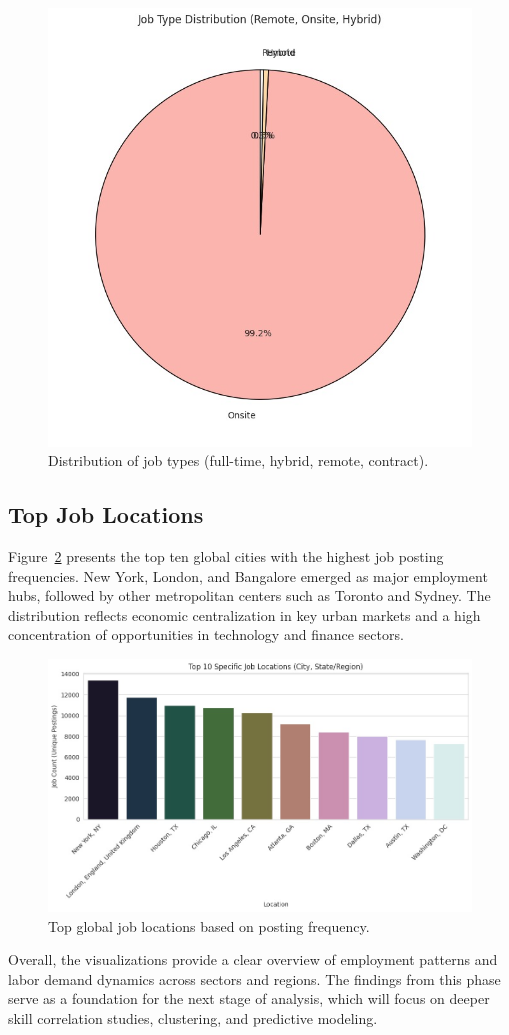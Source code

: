 \documentclass[conference]{IEEEtran}
\begin{document}
\begin{figure}[htbp]
    \centering
    \includegraphics[width=0.5\linewidth]{fig 1.jpeg}
    \caption{Distribution of job types (full-time, hybrid, remote, contract).}
\label{fig:jobtype}
\end{figure}


\subsection{Top Job Locations}
Figure~\ref{fig:locations} presents the top ten global cities with the highest job posting frequencies. New York, London, and Bangalore emerged as major employment hubs, followed by other metropolitan centers such as Toronto and Sydney. The distribution reflects economic centralization in key urban markets and a high concentration of opportunities in technology and finance sectors.

\begin{figure}[htbp]
    \centering
    \includegraphics[width=0.5\linewidth]{joblocations.jpeg}
\caption{Top global job locations based on posting frequency.}
\label{fig:locations}
\end{figure}


Overall, the visualizations provide a clear overview of employment patterns and labor demand dynamics across sectors and regions. The findings from this phase serve as a foundation for the next stage of analysis, which will focus on deeper skill correlation studies, clustering, and predictive modeling.
\end{document}
